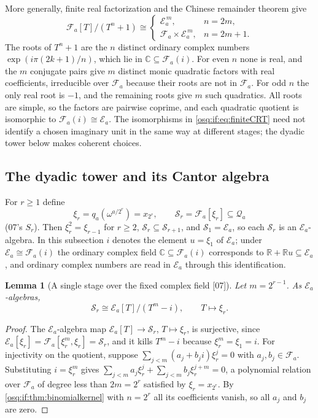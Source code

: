 \documentclass[11pt,letterpaper]{article}
\numberwithin{equation}{section}
\newtheorem{lemma}[lemma]{Lemma}
\theoremstyle{definition}
\theoremstyle{remark}
\theoremstyle{plain}
\newcommand{\R}{\mathbb R}
\newcommand{\C}{\mathbb C}
\newcommand{\FF}{\mathscr F}         %
\newcommand{\EE}{\mathscr E}         %
\newcommand{\Qa}{\mathcal Q}         %
\newcommand{\src}[1]{\textup{\textsf{[#1]}}}
\begin{document}
More generally, finite real factorization and the Chinese remainder theorem give
\begin{equation}\label{osq:if:eq:finiteCRT}
 \FF_a[T]/(T^n+1)\cong
 \begin{cases}
 \EE_a^{\,m}, & n=2m,\\[2pt]
 \FF_a\times\EE_a^{\,m}, & n=2m+1.
 \end{cases}
\end{equation}
The roots of $T^n+1$ are the $n$ distinct ordinary complex numbers
$\exp(i\pi(2k+1)/n)$, which lie in $\C\subseteq\FF_a(i)$. For even $n$ none is real, and
the $m$ conjugate pairs give $m$ distinct monic quadratic factors with real coefficients,
irreducible over $\FF_a$ because their roots are not in $\FF_a$. For odd $n$ the only real
root is $-1$, and the remaining roots give $m$ such quadratics. All roots are simple, so
the factors are pairwise coprime, and each quadratic quotient is isomorphic to
$\FF_a(i)\cong\EE_a$. The isomorphisms in \eqref{osq:if:eq:finiteCRT} need not identify a
chosen imaginary unit in the same way at different stages; the dyadic tower below makes
coherent choices.

\subsection{The dyadic tower and its Cantor algebra}\label{osq:if:sub:cantor}

For $r\ge1$ define
\[
 \xi_r=q_a(\omega^{a/2^r})=x_{2^r},\qquad \mathcal S_r=\FF_a[\xi_r]\subseteq\Qa_a
\]
(07's $S_r$). Then $\xi_r^2=\xi_{r-1}$ for $r\ge2$, $\mathcal S_r\subseteq\mathcal S_{r+1}$,
and $\mathcal S_1=\EE_a$, so each $\mathcal S_r$ is an $\EE_a$-algebra. In this subsection
$i$ denotes the element $u=\xi_1$ of $\EE_a$; under $\EE_a\cong\FF_a(i)$ the ordinary
complex field $\C\subseteq\FF_a(i)$ corresponds to $\R+\R u\subseteq\EE_a$, and ordinary
complex numbers are read in $\EE_a$ through this identification.

\begin{lemma}[A single stage over the fixed complex field \src{07}]\label{osq:if:lem:stage}
Let $m=2^{r-1}$. As $\EE_a$-algebras,
\begin{equation}\label{osq:if:eq:stage}
 \mathcal S_r\cong\EE_a[T]/(T^m-i),\qquad T\mapsto\xi_r .
\end{equation}
\end{lemma}

\begin{proof}
The $\EE_a$-algebra map $\EE_a[T]\to\mathcal S_r$, $T\mapsto\xi_r$, is surjective, since
$\EE_a[\xi_r]=\FF_a[\xi_r^m,\xi_r]=\mathcal S_r$, and it kills $T^m-i$ because
$\xi_r^m=\xi_1=i$. For injectivity on the quotient, suppose
$\sum_{j<m}(a_j+b_ji)\xi_r^j=0$ with $a_j,b_j\in\FF_a$. Substituting $i=\xi_r^m$ gives
$\sum_{j<m}a_j\xi_r^j+\sum_{j<m}b_j\xi_r^{j+m}=0$, a polynomial relation over $\FF_a$ of
degree less than $2m=2^r$ satisfied by $\xi_r=x_{2^r}$. By
\cref{osq:if:thm:binomialkernel} with $n=2^r$ all its coefficients vanish, so all $a_j$ and
$b_j$ are zero.
\end{proof}
\end{document}
